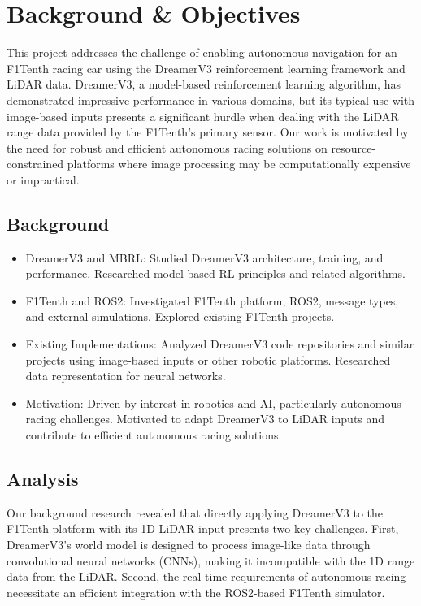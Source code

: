 \chapter{Background \& Objectives}

This project addresses the challenge of enabling autonomous navigation for an F1Tenth racing car using the DreamerV3 reinforcement learning framework and LiDAR data. DreamerV3, a model-based reinforcement learning algorithm, has demonstrated impressive performance in various domains, but its typical use with image-based inputs presents a significant hurdle when dealing with the LiDAR range data provided by the F1Tenth's primary sensor. Our work is motivated by the need for robust and efficient autonomous racing solutions on resource-constrained platforms where image processing may be computationally expensive or impractical.

\section{Background}
\begin{itemize}
    \item DreamerV3 and MBRL: Studied DreamerV3 architecture, training, and performance. Researched model-based RL principles and related algorithms.
    \item F1Tenth and ROS2: Investigated F1Tenth platform, ROS2, message types, and external simulations. Explored existing F1Tenth projects.
    \item Existing Implementations: Analyzed DreamerV3 code repositories and similar projects using image-based inputs or other robotic platforms. Researched data representation for neural networks.
    \item Motivation: Driven by interest in robotics and AI, particularly autonomous racing challenges. Motivated to adapt DreamerV3 to LiDAR inputs and contribute to efficient autonomous racing solutions.
\end{itemize}

\section{Analysis}
Our background research revealed that directly applying DreamerV3 to the F1Tenth platform with its 1D LiDAR input presents two key challenges.  First, DreamerV3's world model is designed to process image-like data through convolutional neural networks (CNNs), making it incompatible with the 1D range data from the LiDAR. Second, the real-time requirements of autonomous racing necessitate an efficient integration with the ROS2-based F1Tenth simulator.

